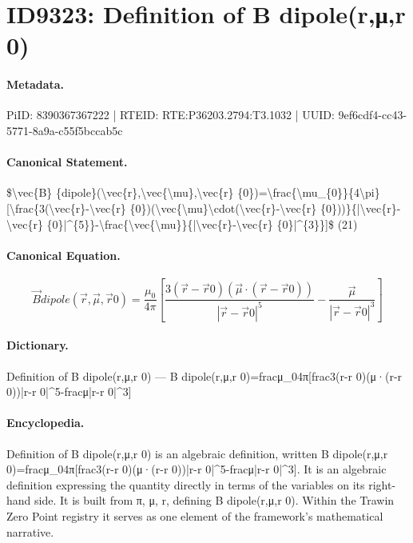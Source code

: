 \section*{ID9323: Definition of B dipole(r,μ,r 0)}
\paragraph{Metadata.}
PiID: 8390367367222 | RTEID: RTE:P36203.2794:T3.1032 | UUID: 9ef6cdf4-cc43-5771-8a9a-c55f5bccab5c

\paragraph{Canonical Statement.}
\$\textbackslash{}vec\{B\} \{dipole\}(\textbackslash{}vec\{r\},\textbackslash{}vec\{\textbackslash{}mu\},\textbackslash{}vec\{r\} \{0\})=\textbackslash{}frac\{\textbackslash{}mu\_\{0\}\}\{4\textbackslash{}pi\}[\textbackslash{}frac\{3(\textbackslash{}vec\{r\}-\textbackslash{}vec\{r\} \{0\})(\textbackslash{}vec\{\textbackslash{}mu\}\textbackslash{}cdot(\textbackslash{}vec\{r\}-\textbackslash{}vec\{r\} \{0\}))\}\{|\textbackslash{}vec\{r\}-\textbackslash{}vec\{r\} \{0\}|\textasciicircum{}\{5\}\}-\textbackslash{}frac\{\textbackslash{}vec\{\textbackslash{}mu\}\}\{|\textbackslash{}vec\{r\}-\textbackslash{}vec\{r\} \{0\}|\textasciicircum{}\{3\}\}]\$ (21)

\paragraph{Canonical Equation.}
\[
\vec{B} {dipole}(\vec{r},\vec{\mu},\vec{r} {0})=\frac{\mu_{0}}{4\pi}[\frac{3(\vec{r}-\vec{r} {0})(\vec{\mu}\cdot(\vec{r}-\vec{r} {0}))}{|\vec{r}-\vec{r} {0}|^{5}}-\frac{\vec{\mu}}{|\vec{r}-\vec{r} {0}|^{3}}]
\]

\paragraph{Dictionary.}
Definition of B dipole(r,μ,r 0) — B dipole(r,μ,r 0)=fracμ\_04π[frac3(r-r 0)(μ·(r-r 0))|r-r 0|\textasciicircum{}5-fracμ|r-r 0|\textasciicircum{}3]

\paragraph{Encyclopedia.}
Definition of B dipole(r,μ,r 0) is an algebraic definition, written B dipole(r,μ,r 0)=fracμ\_04π[frac3(r-r 0)(μ·(r-r 0))|r-r 0|\textasciicircum{}5-fracμ|r-r 0|\textasciicircum{}3]. It is an algebraic definition expressing the quantity directly in terms of the variables on its right-hand side. It is built from π, μ, r, defining B dipole(r,μ,r 0). Within the Trawin Zero Point registry it serves as one element of the framework's mathematical narrative.
